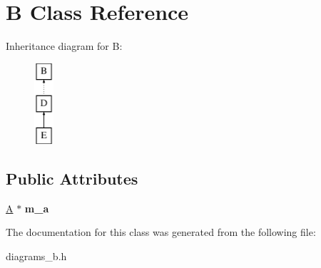 \hypertarget{class_b}{\section{B Class Reference}
\label{class_b}
}
Inheritance diagram for B\-:\begin{figure}[H]
\begin{center}
\leavevmode
\includegraphics[height=3.000000cm]{class_b}
\end{center}
\end{figure}
\subsection*{Public Attributes}
\begin{DoxyCompactItemize}
\item 
\hypertarget{class_b_a26c70b64fe7cf17fcced7755ecff7537}{\hyperlink{class_a}{A} $\ast$ {\bfseries m\-\_\-a}}\label{class_b_a26c70b64fe7cf17fcced7755ecff7537}

\end{DoxyCompactItemize}


The documentation for this class was generated from the following file\-:\begin{DoxyCompactItemize}
\item 
diagrams\-\_\-b.\-h\end{DoxyCompactItemize}
